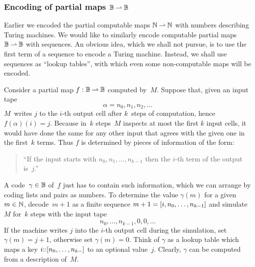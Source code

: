 \subsubsection{Encoding of partial maps $\mathbb{B} \mathbin{\rightharpoonup} \mathbb{B}$}
\label{sec:encoding-maps-baire}

Earlier we encoded the partial computable maps $\mathbb{N} \mathbin{\rightharpoonup} \mathbb{N}$ with numbers describing Turing machines. We would like to similarly encode computable partial maps $\mathbb{B} \mathbin{\rightharpoonup} \mathbb{B}$ with sequences. An obvious idea, which we shall not pursue, is to use the first term of a sequence to encode a Turing machine. Instead, we shall use sequences as ``lookup tables'', with which even some non-computable maps will be encoded.

Consider a partial map $f : \mathbb{B} \mathbin{\rightharpoonup} \mathbb{B}$ computed by~$M$.
Suppose that, given an input tape
%
\begin{equation*}
  \alpha = n_0, n_1, n_2, \ldots
\end{equation*}
%
$M$~writes $j$ to the $i$-th output cell after $k$~steps of computation,
hence $f(\alpha)(i) = j$. Because in~$k$ steps~$M$ inspects at most the first $k$ input cells, it would have done the same for any other input that agrees with the given one in the first~$k$ terms. Thus $f$ is determined by pieces of information of the form:
%
\begin{quote}
  ``If the input starts with $n_0, n_1, \ldots, n_{k-1}$ then the $i$-th term of the output is~$j$.''
\end{quote}
%
A code~$\gamma \in \mathbb{B}$ of~$f$ just has to contain such information, which we can arrange by coding lists and pairs as numbers. To determine the value $\gamma(m)$ for a given $m \in \mathbb{N}$, decode~$m + 1$ as a finite sequence $m + 1 = [i, n_0, \ldots, n_{k-1}]$ and simulate~$M$ for~$k$ steps with the input tape
%
\begin{equation*}
  n_0, \ldots, n_{k-1}, 0, 0, \ldots
\end{equation*}
%
If the machine writes $j$ into the $i$-th output cell during the simulation, set $\gamma(m) = j + 1$, otherwise set $\gamma(m) = 0$.
%
Think of $\gamma$ as a lookup table which maps a key $i {:}{:} [n_0, \ldots, n_{k-}]$ to an optional value~$j$.
%
Clearly, $\gamma$ can be computed from a description of~$M$.

